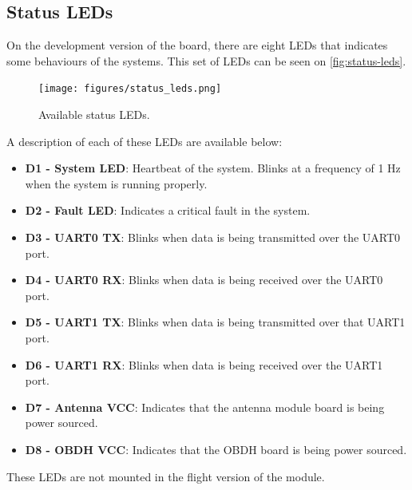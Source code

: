 \subsection{Status LEDs} \label{sec:status-leds}

On the development version of the board, there are eight LEDs that indicates some behaviours of the systems. This set of LEDs can be seen on \autoref{fig:status-leds}.

\begin{figure}[!ht]
    \begin{center}
        \texttt{[image: figures/status\_leds.png]}
        \caption{Available status LEDs.}
        \label{fig:status-leds}
    \end{center}
\end{figure}

A description of each of these LEDs are available below:

\begin{itemize}
    \item \textbf{D1 - System LED}: Heartbeat of the system. Blinks at a frequency of 1 Hz when the system is running properly.
    \item \textbf{D2 - Fault LED}: Indicates a critical fault in the system.
    \item \textbf{D3 - UART0 TX}: Blinks when data is being transmitted over the UART0 port.
    \item \textbf{D4 - UART0 RX}: Blinks when data is being received over the UART0 port.
    \item \textbf{D5 - UART1 TX}: Blinks when data is being transmitted over that UART1 port.
    \item \textbf{D6 - UART1 RX}: Blinks when data is being received over the UART1 port.
    \item \textbf{D7 - Antenna VCC}: Indicates that the antenna module board is being power sourced.
    \item \textbf{D8 - OBDH VCC}: Indicates that the OBDH board is being power sourced.
\end{itemize}

These LEDs are not mounted in the flight version of the module.
